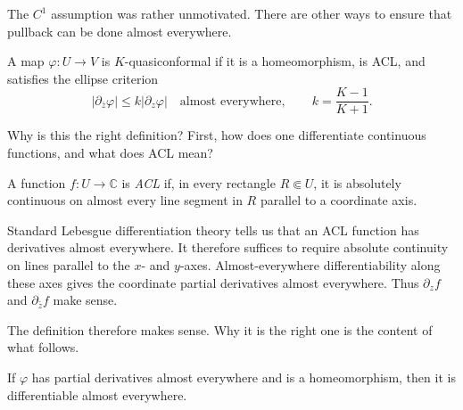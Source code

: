 \documentclass[11pt,a4paper]{article}
\begin{document}
The \(C^1\) assumption was rather unmotivated. There are other ways to ensure that pullback can be done almost everywhere.
\setcounter{definition}{20}\begin{definition}
A map \(\varphi:U\to V\) is \(K\)-quasiconformal if it is a homeomorphism, is ACL, and satisfies the ellipse criterion
\[
|\partial_{\bar z}\varphi|\le k|\partial_z\varphi|
\quad\text{almost everywhere},\qquad k=\frac{K-1}{K+1}.
\]
\end{definition}
Why is this the right definition? First, how does one differentiate continuous functions, and what does ACL mean?
\setcounter{definition}{21}\begin{definition}
A function \(f:U\to\mathbb C\) is \emph{ACL} if, in every rectangle \(R\Subset U\), it is absolutely continuous on almost every line segment in \(R\) parallel to a coordinate axis.
\end{definition}
\begin{remark}
Standard Lebesgue differentiation theory tells us that an ACL function has derivatives almost everywhere. It therefore suffices to require absolute continuity on lines parallel to the \(x\)- and \(y\)-axes.
Almost-everywhere differentiability along these axes gives the coordinate partial derivatives almost everywhere. Thus \(\partial_zf\) and \(\partial_{\bar z}f\) make sense.
\end{remark}
The definition therefore makes sense. Why it is the right one is the content of what follows.
\setcounter{theorem}{38}\begin{lemma}
If \(\varphi\) has partial derivatives almost everywhere and is a homeomorphism, then it is differentiable almost everywhere.
\end{lemma}
\end{document}
